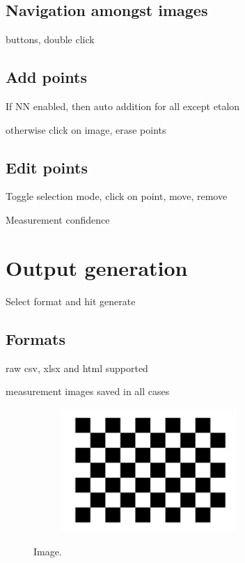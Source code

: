 \documentclass[10pt,a4paper,oneside]{report}             %
\begin{document}
\subsection{Navigation amongst images}

buttons, double click

\subsection{Add points}

If NN enabled, then auto addition for all except etalon

otherwise click on image, erase points

\subsection{Edit points}

Toggle selection mode, click on point, move, remove

Measurement confidence

\section{Output generation}

Select format and hit generate

\subsection{Formats}

raw csv, xlsx and html supported

measurement images saved in all cases
 

\begin{figure}[!htb]
\centering
\begin{subfigure}{\textwidth}
\centering 
\includegraphics[height=4.7cm]{../VAM/Icons/chessboard.png}
\end{subfigure}
\caption[]
{\small  Image.}
\end{figure} 
\end{document}
